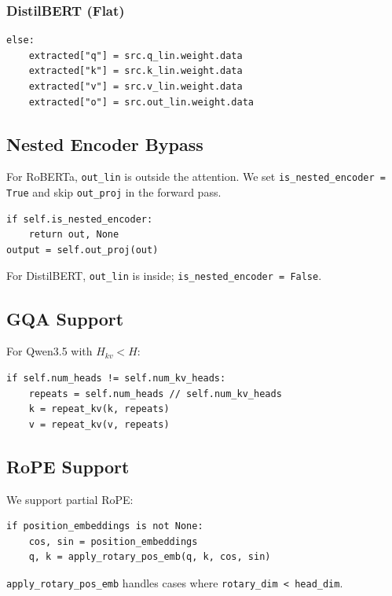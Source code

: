 \subsubsection{DistilBERT (Flat)}

\begin{lstlisting}
else:
    extracted["q"] = src.q_lin.weight.data
    extracted["k"] = src.k_lin.weight.data
    extracted["v"] = src.v_lin.weight.data
    extracted["o"] = src.out_lin.weight.data
\end{lstlisting}

\subsection{Nested Encoder Bypass}

For RoBERTa, \texttt{out\_lin} is outside the attention. We set 
\texttt{is\_nested\_encoder = True} and skip \texttt{out\_proj} in the forward pass.

\begin{lstlisting}
if self.is_nested_encoder:
    return out, None
output = self.out_proj(out)
\end{lstlisting}

For DistilBERT, \texttt{out\_lin} is inside; \texttt{is\_nested\_encoder = False}.

\subsection{GQA Support}

For Qwen3.5 with $H_{kv} < H$:

\begin{lstlisting}
if self.num_heads != self.num_kv_heads:
    repeats = self.num_heads // self.num_kv_heads
    k = repeat_kv(k, repeats)
    v = repeat_kv(v, repeats)
\end{lstlisting}

\subsection{RoPE Support}

We support partial RoPE:

\begin{lstlisting}
if position_embeddings is not None:
    cos, sin = position_embeddings
    q, k = apply_rotary_pos_emb(q, k, cos, sin)
\end{lstlisting}

\texttt{apply\_rotary\_pos\_emb} handles cases where \texttt{rotary\_dim < head\_dim}.

